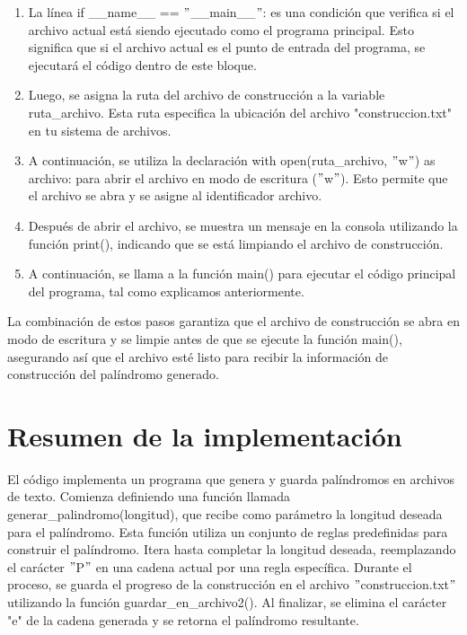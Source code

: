 \begin{enumerate}

\item La línea if \_\_name\_\_ == $"$\_\_main\_\_$"$: es una condición que verifica si el archivo actual está siendo ejecutado como el programa principal. Esto significa que si el archivo actual es el punto de entrada del programa, se ejecutará el código dentro de este bloque.

\item Luego, se asigna la ruta del archivo de construcción a la variable ruta\_archivo. Esta ruta especifica la ubicación del archivo "construccion.txt" en tu sistema de archivos.

\item A continuación, se utiliza la declaración with open(ruta\_archivo, $"$w$"$) as archivo: para abrir el archivo en modo de escritura ($"$w$"$). Esto permite que el archivo se abra y se asigne al identificador archivo.

\item Después de abrir el archivo, se muestra un mensaje en la consola utilizando la función print(), indicando que se está limpiando el archivo de construcción.

\item A continuación, se llama a la función main() para ejecutar el código principal del programa, tal como explicamos anteriormente.

\end{enumerate}

La combinación de estos pasos garantiza que el archivo de construcción se abra en modo de escritura y se limpie antes de que se ejecute la función main(), asegurando así que el archivo esté listo para recibir la información de construcción del palíndromo generado.

\newpage
\section{Resumen de la implementación} 
El código implementa un programa que genera y guarda palíndromos en archivos de texto. Comienza definiendo una función llamada generar\_palindromo(longitud), que recibe como parámetro la longitud deseada para el palíndromo. Esta función utiliza un conjunto de reglas predefinidas para construir el palíndromo. Itera hasta completar la longitud deseada, reemplazando el carácter $"$P$"$ en una cadena actual por una regla específica. Durante el proceso, se guarda el progreso de la construcción en el archivo $"$construccion.txt$"$ utilizando la función guardar\_en\_archivo2(). Al finalizar, se elimina el carácter "e" de la cadena generada y se retorna el palíndromo resultante.\newline
\\

